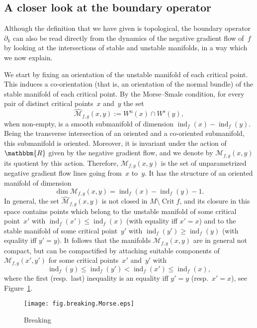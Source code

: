 \documentclass[12pt,twoside]{amsart}
\theoremstyle{plain}
\numberwithin{figure}{section}
\numberwithin{equation}{section}
\def\ss{\operatorname{s}}
\def\u{\operatorname{u}}
\def\ind{\operatorname{ind}}
\def\Crit{\operatorname{Crit}}
\def\RR{\mathbbm{R}}
\begin{document}
\subsection{A closer look at the boundary operator}  \label{s:closer}
Although the definition that we have given is topological, the boundary operator~$\partial_k$ 
can also be read directly from the dynamics of the negative gradient flow of~$f$ by looking at the intersections of stable and unstable manifolds, in a way which we now explain. 

We start by fixing an orientation of the unstable manifold of each critical point. 
This induces a co-orientation (that is, an orientation of the normal bundle) 
of the stable manifold of each critical point.
By the Morse--Smale condition, for every pair of distinct critical points~$x$ and~$y$ the set
\[
\widehat{\mathcal{M}}_{f,g}(x,y) := W^{\u}(x) \cap W^{\ss}(y),
\]
when non-empty, is a smooth submanifold of dimension $\ind_f(x) - \ind_f(y)$. Being the transverse intersection of an oriented and a co-oriented submanifold, this submanifold is oriented. Moreover, it
is invariant under the action of~$\RR$ given by the negative gradient flow, 
and we denote by $\mathcal{M}_{f,g}(x,y)$ its quotient by this action. 
Therefore, $\mathcal{M}_{f,g}(x,y)$ is the set of unparametrized negative gradient flow lines 
going from~$x$ to~$y$. It has the structure of an oriented manifold of dimension
\[
\dim \mathcal{M}_{f,g}(x,y) = \ind_f(x) - \ind_f(y) - 1.
\]
In general, the set $\widehat{\mathcal{M}}_{f,g}(x,y)$ is not closed in $M \setminus \Crit f$, 
and its closure in this space contains
points which belong to the unstable manifold of some critical point~$x'$ with $\ind_f(x') \leqslant \ind_f(x)$ (with equality iff $x'=x$) and to the stable manifold of some critical point~$y'$ with $\ind_f(y') \geqslant \ind_f(y)$ (with equality iff $y'=y$). 
It follows that the manifolds $\mathcal{M}_{f,g}(x,y)$ are in general not compact, 
but can be compactified by attaching suitable components of $\mathcal{M}_{f,g}(x',y')$ 
for some critical points~$x'$ and~$y'$ with 
\[
\ind_f(y) \leqslant \ind_f(y') < \ind_f(x') \leqslant \ind_f(x),
\]
where the first (resp.\ last) inequality is an equality iff $y'=y$ (resp.\ $x'=x$), 
see Figure~\ref{fig.breaking.Morse}. 

\begin{figure}[h]   
 \begin{center}
  \leavevmode\texttt{[image: fig.breaking.Morse.eps]}
 \end{center}
 \caption{Breaking}  \label{fig.breaking.Morse}
\end{figure}
\end{document}
